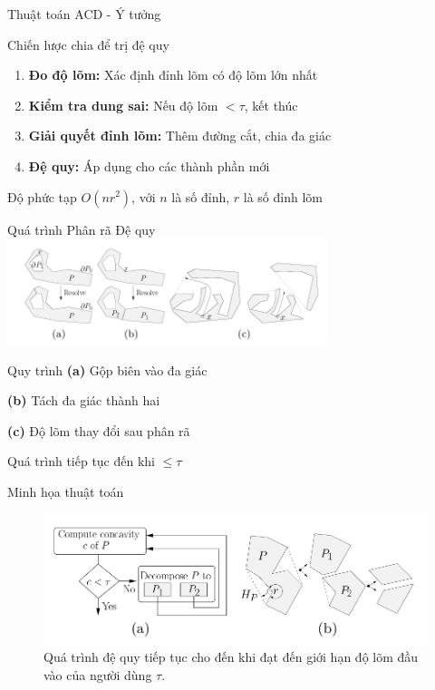 \documentclass[aspectratio=169]{beamer}
\begin{document}
\begin{frame}{Thuật toán ACD - Ý tưởng}

    \begin{exampleblock}{Chiến lược chia để trị đệ quy}
        \begin{enumerate}
            \item \textbf{Đo độ lõm:} Xác định đỉnh lõm có độ lõm lớn nhất
            \item \textbf{Kiểm tra dung sai:} Nếu độ lõm $< \tau$, kết thúc
            \item \textbf{Giải quyết đỉnh lõm:} Thêm đường cắt, chia đa giác
            \item \textbf{Đệ quy:} Áp dụng cho các thành phần mới
        \end{enumerate}
    \end{exampleblock}

    \begin{block}{Độ phức tạp}
        $O(n r^2)$, với $n$ là số đỉnh, $r$ là số đỉnh lõm
    \end{block}

\end{frame}

\begin{frame}{Quá trình Phân rã Đệ quy}
    \centering
    \includegraphics[width=0.7\textwidth]{imgs/ACD-3.png}

    \begin{block}{Quy trình}
        \textbf{(a)} Gộp biên vào đa giác

        \textbf{(b)} Tách đa giác thành hai

        \textbf{(c)} Độ lõm thay đổi sau phân rã

        \vspace{0.2cm}
        Quá trình tiếp tục đến khi $\leq \tau$
    \end{block}
\end{frame}

\begin{frame}{Minh họa thuật toán}
    \begin{figure}
        \centering
        \includegraphics[width=0.8\linewidth]{imgs/ACD-1.png}
        \caption{Quá trình đệ quy tiếp tục cho đến khi đạt đến giới hạn độ lõm đầu vào của người dùng $\tau$.}
    \end{figure}
\end{frame}
\end{document}
